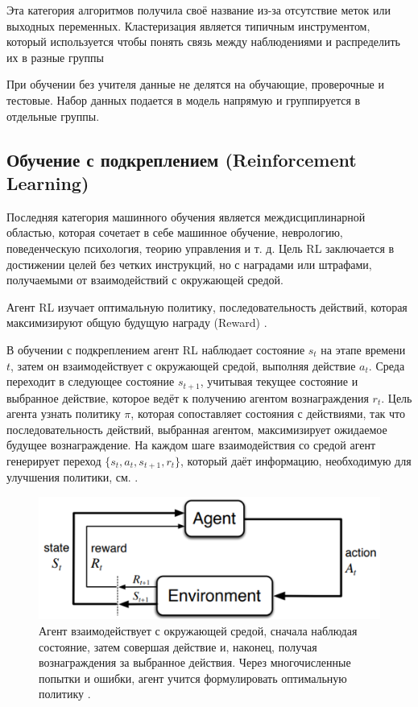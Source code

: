 Эта категория алгоритмов получила своё название из-за отсутствие меток или выходных переменных. Кластеризация является типичным инструментом, который используется чтобы понять связь между наблюдениями и распределить их в разные группы \cite{hastie2001elements}

При обучении без учителя данные не делятся на обучающие, проверочные и тестовые. Набор данных подается в модель напрямую и группируется в отдельные группы.


\subsection{Обучение с подкреплением (Reinforcement Learning)}

Последняя категория машинного обучения является междисциплинарной областью, которая сочетает в себе машинное обучение, неврологию, поведенческую психология, теорию управления и т. д. Цель RL заключается в достижении целей без четких инструкций, но с наградами или штрафами, получаемыми от взаимодействий с окружающей средой. 

Агент RL изучает оптимальную политику, последовательность действий, которая максимизируют общую будущую награду (Reward) \cite{SuttonAndBarto-RL-Introduction-p2}.

В обучении с подкреплением агент RL наблюдает состояние ${s_t}$ на этапе времени ${t}$, затем он взаимодействует с окружающей средой, выполняя действие ${a_t}$. Среда переходит в следующее состояние ${s_{t+1}}$, учитывая текущее состояние и выбранное действие, которое ведёт к получению агентом вознаграждения ${r_t}$. Цель агента узнать политику $\pi$, которая сопоставляет состояния с действиями, так что последовательность действий, выбранная агентом, максимизирует ожидаемое будущее вознаграждение. На каждом шаге взаимодействия со средой агент генерирует переход ${\{s_t, a_t, s_{t+1}, r_t\}}$, который даёт информацию, необходимую для улучшения политики, см. .

\begin{figure}[ht!] 
	\center
	\includegraphics [scale=0.60] {my_folder/images/ch1/RL-flow.png}
	\caption{Агент взаимодействует с окружающей средой, сначала наблюдая состояние, затем совершая действие и, наконец, получая вознаграждения за выбранное действия. Через многочисленные попытки и ошибки, агент учится формулировать оптимальную политику \cite{SuttonAndBarto-RL-Introduction-p50}.} 
	\label{fig:ch1-RL-flow}
\end{figure}
